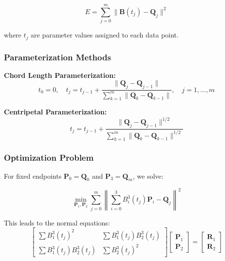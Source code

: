 \documentclass[12pt,a4paper]{article}
\begin{document}
\begin{equation}
E = \sum_{j=0}^{m} \|\mathbf{B}(t_j) - \mathbf{Q}_j\|^2
\end{equation}

where $t_j$ are parameter values assigned to each data point.

\subsubsection{Parameterization Methods}

\textbf{Chord Length Parameterization:}
\begin{equation}
t_0 = 0, \quad t_j = t_{j-1} + \frac{\|\mathbf{Q}_j - \mathbf{Q}_{j-1}\|}{\sum_{k=1}^{m}\|\mathbf{Q}_k - \mathbf{Q}_{k-1}\|}, \quad j=1,\ldots,m
\end{equation}

\textbf{Centripetal Parameterization:}
\begin{equation}
t_j = t_{j-1} + \frac{\|\mathbf{Q}_j - \mathbf{Q}_{j-1}\|^{1/2}}{\sum_{k=1}^{m}\|\mathbf{Q}_k - \mathbf{Q}_{k-1}\|^{1/2}}
\end{equation}

\subsubsection{Optimization Problem}

For fixed endpoints $\mathbf{P}_0 = \mathbf{Q}_0$ and $\mathbf{P}_3 = \mathbf{Q}_m$, we solve:

\begin{equation}
\min_{\mathbf{P}_1, \mathbf{P}_2} \sum_{j=0}^{m} \left\|\sum_{i=0}^{3} B_i^3(t_j)\mathbf{P}_i - \mathbf{Q}_j\right\|^2
\end{equation}

This leads to the normal equations:
\begin{equation}
\begin{bmatrix}
\sum B_1^3(t_j)^2 & \sum B_1^3(t_j)B_2^3(t_j) \\
\sum B_1^3(t_j)B_2^3(t_j) & \sum B_2^3(t_j)^2
\end{bmatrix}
\begin{bmatrix}
\mathbf{P}_1 \\
\mathbf{P}_2
\end{bmatrix}
=
\begin{bmatrix}
\mathbf{R}_1 \\
\mathbf{R}_2
\end{bmatrix}
\end{equation}
\end{document}
